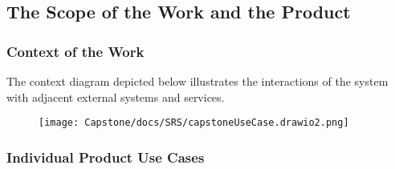 \documentclass[12pt]{article}
\begin{document}
\subsection{The Scope of the Work and the Product}
\subsubsection{Context of the Work}
The context diagram depicted below illustrates the interactions of the system with adjacent
external systems and services.
\begin{figure}[htbp]
\centerline{\texttt{[image: Capstone/docs/SRS/capstoneUseCase.drawio2.png]}}
\label{UseCaseDiagram}
\end{figure}

\newpage
\subsubsection{Individual Product Use Cases}
\end{document}
